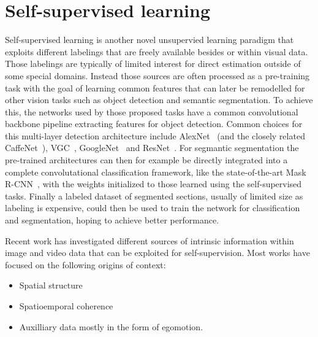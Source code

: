 \section{Self-supervised learning}
Self-supervised learning is another novel unsupervied learning paradigm that exploits different labelings that are freely available besides or within visual data. Those labelings are typically of limited interest for direct estimation outside of some special domains. Instead those sources are often processed as a pre-training task with the goal of learning common features that can later be remodelled for other vision tasks such as object detection and semantic segmentation\cite{misra2016}. To achieve this, the networks used by those proposed tasks have a common convolutional backbone pipeline extracting features for object detection. Common choices for this multi-layer detection architecture include AlexNet~\cite{krizhevsky2012} (and the closely related CaffeNet~\cite{jia2014}), VGC~\cite{simonyan2014}, GoogleNet~\cite{szegedy2015} and ResNet~\cite{he2016}. For segmantic segmentation the pre-trained architectures can then for example be directly integrated into a complete convolutational classification framework, like the state-of-the-art Mask R-CNN~\cite{he2017}, with the weights initialized to those learned using the self-supervised tasks. Finally a labeled dataset of segmented sections, usually of limited size as labeling is expensive, could then be used to train the network for classification and segmentation, hoping to achieve better performance.

Recent work has investigated different sources of intrinsic information within image and video data that can be exploited for self-supervision. Most works have focused on the following origins of context: 
\begin{itemize}
\item Spatial structure
\item Spatioemporal coherence 
\item Auxilliary data mostly in the form of egomotion.
\end{itemize}

